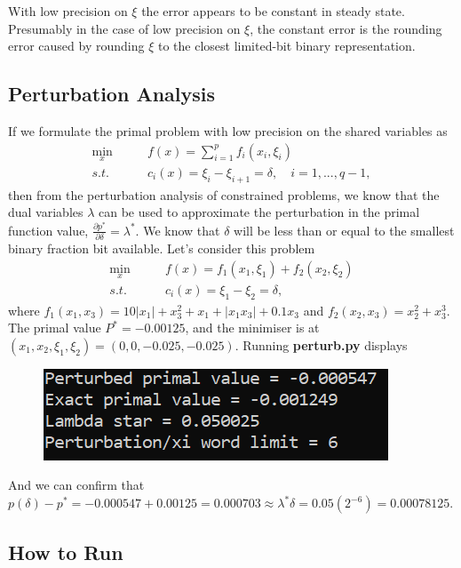 \documentclass[12pt]{article}
\begin{document}
With low precision on $\xi$ the error appears to be constant in steady state. Presumably in the case of low precision on $\xi$, the constant error is the rounding error caused by rounding $\xi$ to the closest limited-bit binary representation.

\subsection*{Perturbation Analysis}

If we formulate the primal problem with low precision on the shared variables as
\begin{align*}
\min_x\qquad& f(x)=\sum\limits_{i=1}^{p}f_i(x_i,\xi_i)\\
s.t.\qquad&c_i(x)=\xi_i-\xi_{i+1}=\delta,\quad i=1,...,q-1,
\end{align*}
then from the perturbation analysis of constrained problems, we know that the dual variables $\lambda$ can be used to approximate the perturbation in the primal function value, $\frac{\partial p^*}{\partial \delta}=\lambda^*$. We know that $\delta$ will be less than or equal to the smallest binary fraction bit available. Let's consider this problem
\begin{align*}
\min_x\qquad& f(x)=f_1(x_1,\xi_1)+f_2(x_2,\xi_2)\\
s.t.\qquad&c_i(x)=\xi_1-\xi_2=\delta,
\end{align*}
where $f_1(x_1,x_3)=10|x_1|+x_3^2+x_1+|x_1x_3|+0.1x_3$ and $f_2(x_2,x_3)=x_2^2+x_3^3$. The primal value $P^*=-0.00125$, and the minimiser is at $(x_1,x_2,\xi_1,\xi_2)=(0,0,-0.025,-0.025)$. Running \textbf{perturb.py} displays

\begin{figure}[H]
	\centering
	\includegraphics[scale=1]{Problem4-Perturbed.png}
\end{figure}
And we can confirm that $p(\delta)-p^*=-0.000547+0.00125=0.000703\approx \lambda^* \delta=0.05(2^{-6})=0.00078125$.




\subsection*{How to Run}
\end{document}
